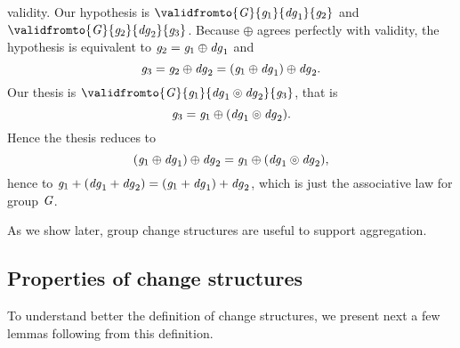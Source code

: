 \begin{definition}
\begin{subdefinition}
  validity. Our hypothesis is \ensuremath{\validfromto{\Conid{G}}{\Varid{g}_{1}}{\Varid{dg}_{1}}{\Varid{g}_{2}}} and \ensuremath{\validfromto{\Conid{G}}{\Varid{g}_{2}}{\Varid{dg}_{2}}{\Varid{g}_{3}}}.
  Because \ensuremath{\oplus } agrees perfectly with validity, the
  hypothesis is equivalent to \ensuremath{\Varid{g}_{2}\mathrel{=}\Varid{g}_{1}\oplus \Varid{dg}_{1}} and
  \[\mathit{g}_{3}\mathrel{=}\mathit{g}_{2}\oplus \mathit{dg}_{2}\mathrel{=}(\mathit{g}_{1}\oplus \mathit{dg}_{1})\oplus \mathit{dg}_{2}.\]
  Our thesis is \ensuremath{\validfromto{\Conid{G}}{\Varid{g}_{1}}{\Varid{dg}_{1}\circledcirc \Varid{dg}_{2}}{\Varid{g}_{3}}}, that is
  \[\mathit{g}_{3}\mathrel{=}\mathit{g}_{1}\oplus (\mathit{dg}_{1}\circledcirc \mathit{dg}_{2}).\]
  Hence the thesis reduces to
  \[(\mathit{g}_{1}\oplus \mathit{dg}_{1})\oplus \mathit{dg}_{2}\mathrel{=}\mathit{g}_{1}\oplus (\mathit{dg}_{1}\circledcirc \mathit{dg}_{2}),\]
  hence to \ensuremath{\Varid{g}_{1}\mathbin{+}(\Varid{dg}_{1}\mathbin{+}\Varid{dg}_{2})\mathrel{=}(\Varid{g}_{1}\mathbin{+}\Varid{dg}_{1})\mathbin{+}\Varid{dg}_{2}}, which is just
  the associative law for group \ensuremath{\Conid{G}}.
\end{subdefinition}
\end{definition}

As we show later, group change structures are useful to support
aggregation.
\subsection{Properties of change structures}
\label{sec:chs-properties}
To understand better the definition of change structures, we
present next a few lemmas following from this definition.

